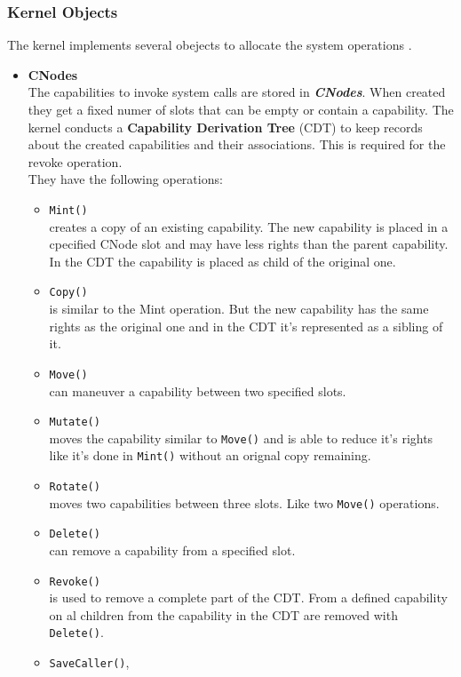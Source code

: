 \documentclass[pdftex,11pt,a4paper]{article}
\begin{document}
	\subsubsection{Kernel Objects}\label{sec:KernelObjects}
	The kernel implements several obejects to allocate the system operations \cite{Manual}.
	\begin{itemize}
	\item \textbf{CNodes} \\
	The capabilities to invoke system calls are stored in \textbf{\textit{CNodes}}. When created they get a fixed numer of slots that can be empty or contain a capability. 
	The kernel conducts a \textbf{Capability Derivation Tree} (CDT) to keep records about the created capabilities and their associations. This is required for the revoke operation. \\ 
	They have the following operations:
\begin{itemize}
\item \texttt{Mint()} \\
creates a copy of an existing capability. The new capability is placed in a cpecified CNode slot and may have less rights than the parent capability. In the CDT the capability is placed as child of the original one. 
\item \texttt{Copy()} \\
is similar to the Mint operation. But the new capability has the same rights as the original one and in the CDT it's represented as a sibling of it. 
\item \texttt{Move()} \\
can maneuver a capability between two specified slots. 
\item \texttt{Mutate()} \\
moves the capability similar to \texttt{Move()} and is able to reduce it's rights like it's done in \texttt{Mint()} without an orignal copy remaining.
\item \texttt{Rotate()} \\
moves two capabilities between three slots. Like two \texttt{Move()} operations. 
\item \texttt{Delete()} \\
can remove a capability from a specified slot.
\item \texttt{Revoke()} \\
is used to remove a complete part of the CDT. From a defined capability on al children from the capability in the CDT are removed with \texttt{Delete()}. 
\item \texttt{SaveCaller()}, 

\end{itemize}
\end{itemize}
\end{document}
